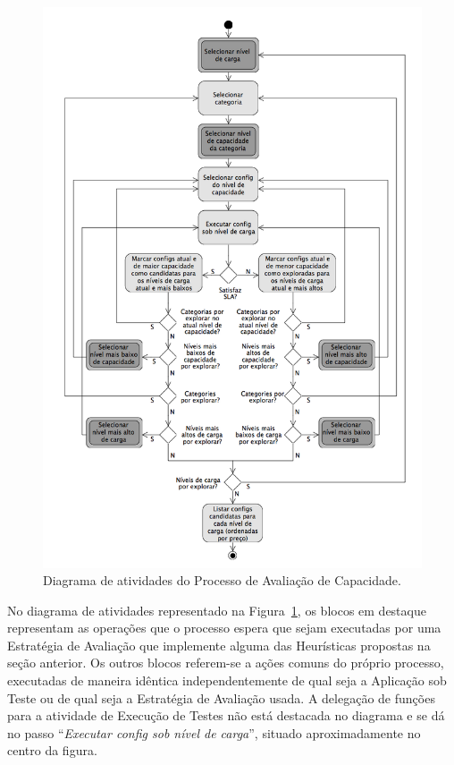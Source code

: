 \documentclass[12pt]{article}
\begin{document}
\begin{figure}
  \begin{center}
    \includegraphics[scale=0.5]{img/capacity-planning-diagram-v13-mono}
  \end{center}
  \caption{\label{fig:fig_processo_aval_capacidade}Diagrama de atividades do Processo de Avaliação de Capacidade.}
\end{figure}


No diagrama de atividades representado na Figura~\ref{fig:fig_processo_aval_capacidade}, os blocos em destaque representam as operações que o processo espera que sejam executadas por uma Estratégia de 
Avaliação que implemente alguma das Heurísticas propostas na seção anterior. Os outros 
blocos referem-se a ações comuns do próprio processo, executadas de maneira 
idêntica independentemente de qual seja a Aplicação sob Teste ou de qual seja a 
Estratégia de Avaliação usada. A delegação de funções para a atividade de Execução
de Testes não está destacada no diagrama e se dá no passo ``\emph{Executar
config sob nível de carga}'', situado aproximadamente no centro da figura.
\end{document}
